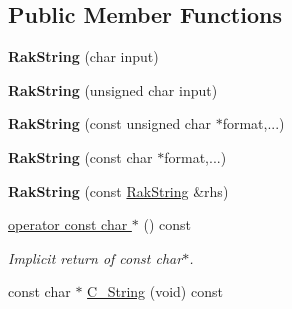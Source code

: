 \subsection*{Public Member Functions}
\begin{DoxyCompactItemize}
\item 
\hypertarget{class_rak_net_1_1_rak_string_a644bf38666e62bcd3aa4ea096001bacd}{{\bfseries Rak\-String} (char input)}\label{class_rak_net_1_1_rak_string_a644bf38666e62bcd3aa4ea096001bacd}

\item 
\hypertarget{class_rak_net_1_1_rak_string_a3f2addd3c6936019092c7792997bdb8e}{{\bfseries Rak\-String} (unsigned char input)}\label{class_rak_net_1_1_rak_string_a3f2addd3c6936019092c7792997bdb8e}

\item 
\hypertarget{class_rak_net_1_1_rak_string_ac7c52254083e3cf411208563c5cfcd4e}{{\bfseries Rak\-String} (const unsigned char $\ast$format,...)}\label{class_rak_net_1_1_rak_string_ac7c52254083e3cf411208563c5cfcd4e}

\item 
\hypertarget{class_rak_net_1_1_rak_string_a899b507fe9e8c718e2951411ec6d93f0}{{\bfseries Rak\-String} (const char $\ast$format,...)}\label{class_rak_net_1_1_rak_string_a899b507fe9e8c718e2951411ec6d93f0}

\item 
\hypertarget{class_rak_net_1_1_rak_string_ad05fbeca4f3bf9e1b24e24bca35e23d5}{{\bfseries Rak\-String} (const \hyperlink{class_rak_net_1_1_rak_string}{Rak\-String} \&rhs)}\label{class_rak_net_1_1_rak_string_ad05fbeca4f3bf9e1b24e24bca35e23d5}

\item 
\hypertarget{class_rak_net_1_1_rak_string_adbb9f791e47d30829cfd32682fa2fa1d}{\hyperlink{class_rak_net_1_1_rak_string_adbb9f791e47d30829cfd32682fa2fa1d}{operator const char $\ast$} () const }\label{class_rak_net_1_1_rak_string_adbb9f791e47d30829cfd32682fa2fa1d}

\begin{DoxyCompactList}\small\item\em Implicit return of const char$\ast$. \end{DoxyCompactList}\item 
\hypertarget{class_rak_net_1_1_rak_string_ae8fe1422249ea883413a535d01d8ffea}{const char $\ast$ \hyperlink{class_rak_net_1_1_rak_string_ae8fe1422249ea883413a535d01d8ffea}{C\-\_\-\-String} (void) const }\label{class_rak_net_1_1_rak_string_ae8fe1422249ea883413a535d01d8ffea}


\end{DoxyCompactItemize}

